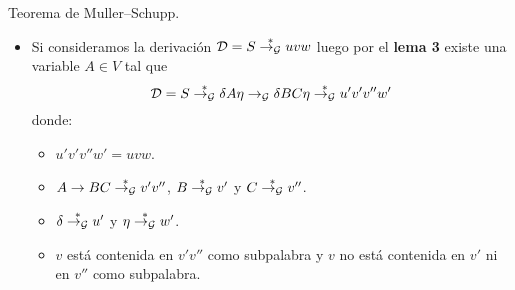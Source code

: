 \documentclass[aspectratio=169, 10pt]{beamer}
\begin{document}



	\begin{frame}[fragile]{Teorema de Muller--Schupp.}
		\begin{itemize}

			\item 
			Si consideramos la derivación ${\cal D} = S \overset{*}{\to_{\cal G}} uvw$ luego por el \textbf{lema 3} existe una variable $A \in V$ tal que
			\[
				{\cal D} = S \overset{*}{\to_{\cal G}} \delta A \eta \to_{{\cal G}} \delta BC \eta \overset{*}{\to_{\cal G}} u'v'v''w'
			\]
			donde:
			\begin{itemize}
				\item $u'v'v''w' = uvw$.
				\item $A \to BC \overset{*}{\to_{\cal G}} v'v''$, $B \overset{*}{\to_{\cal G}} v'$ y $C \overset{*}{\to_{\cal G}} v''$.
				\item $\delta \overset{*}{\to_{\cal G}} u'$ y $\eta \overset{*}{\to_{\cal G}} w'$.
				\item $v$ está contenida en $v'v''$ como subpalabra y $v$ no está contenida en $v'$ ni en $v''$ como subpalabra.
			\end{itemize} 
		\end{itemize}
	\end{frame}
	
\end{document}
